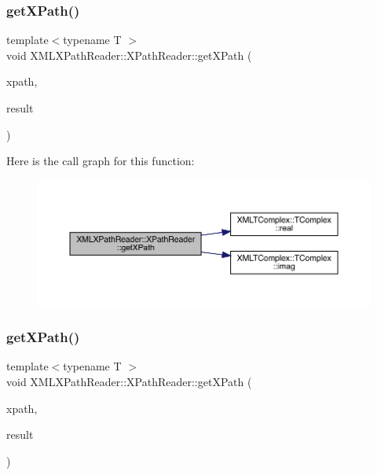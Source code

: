 \subsubsection{\texorpdfstring{getXPath()}{getXPath()}\hspace{0.1cm}{\footnotesize\ttfamily [4/6]}}
{\footnotesize\ttfamily template$<$typename T $>$ \\
void X\+M\+L\+X\+Path\+Reader\+::\+X\+Path\+Reader\+::get\+X\+Path (\begin{DoxyParamCaption}\item[{const std\+::string \&}]{xpath,  }\item[{\mbox{\hyperlink{classXMLTComplex_1_1TComplex}{X\+M\+L\+T\+Complex\+::\+T\+Complex}}$<$ T $>$ \&}]{result }\end{DoxyParamCaption})\hspace{0.3cm}{\ttfamily [inline]}}

Here is the call graph for this function\+:
\nopagebreak
\begin{figure}[H]
\begin{center}
\leavevmode
\includegraphics[width=350pt]{d3/d5a/classXMLXPathReader_1_1XPathReader_a82579390a7b37879a7a7d9b79934a592_cgraph}
\end{center}
\end{figure}
\mbox{\label{classXMLXPathReader_1_1XPathReader_a2c16b804ab7842a5bab7a8fe3f433437}} 
\subsubsection{\texorpdfstring{getXPath()}{getXPath()}\hspace{0.1cm}{\footnotesize\ttfamily [5/6]}}
{\footnotesize\ttfamily template$<$typename T $>$ \\
void X\+M\+L\+X\+Path\+Reader\+::\+X\+Path\+Reader\+::get\+X\+Path (\begin{DoxyParamCaption}\item[{const std\+::string \&}]{xpath,  }\item[{\mbox{\hyperlink{classXMLArray_1_1Array}{Array}}$<$ T $>$ \&}]{result }\end{DoxyParamCaption})\hspace{0.3cm}{\ttfamily [inline]}}

